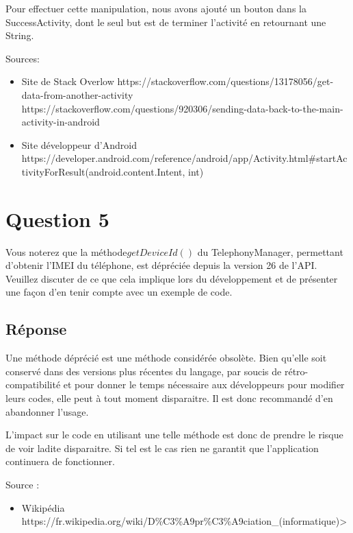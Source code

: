 \documentclass[francais,12pt]{article}
\begin{document}
		 Pour effectuer cette manipulation, nous avons ajouté un bouton dans la SuccessActivity, dont le seul but est de terminer l'activité en retournant une String.
		 
		Sources:
		\begin{itemize}
			\item Site de Stack Overlow\newline
			https://stackoverflow.com/questions/13178056/get-data-from-another-activity\newline
			https://stackoverflow.com/questions/920306/sending-data-back-to-the-main-activity-in-android\newline
			\item Site développeur d'Android\newline
			https://developer.android.com/reference/android/app/Activity.html\#startActivityForResult(android.content.Intent, int)\newline	
		\end{itemize}
		 	 
		 
	\section*{Question 5}
		Vous noterez que la méthode$ getDeviceId()$ du TelephonyManager, permettant d’obtenir l’IMEI du téléphone, est dépréciée depuis la version 26 de l’API. Veuillez discuter de ce que cela implique lors du développement et de présenter une façon d’en tenir compte avec un exemple de code. 
		
		\subsection*{Réponse}
		Une méthode déprécié est une méthode considérée obsolète. Bien qu'elle soit conservé dans des versions plus récentes du langage, par soucis de rétro-compatibilité et pour donner le temps nécessaire aux développeurs pour modifier leurs codes, elle peut à tout moment disparaitre. Il est donc recommandé d'en abandonner l'usage. \newline
		
		L'impact sur le code en utilisant une telle méthode est donc de prendre le risque de voir ladite disparaitre. Si tel est le cas rien ne garantit que l'application continuera de fonctionner.
		
		Source :
		\begin{itemize}
			\item Wikipédia \newline https://fr.wikipedia.org/wiki/D\%C3\%A9pr\%C3\%A9ciation\_(informatique)>
		\end{itemize}
	
\end{document}
